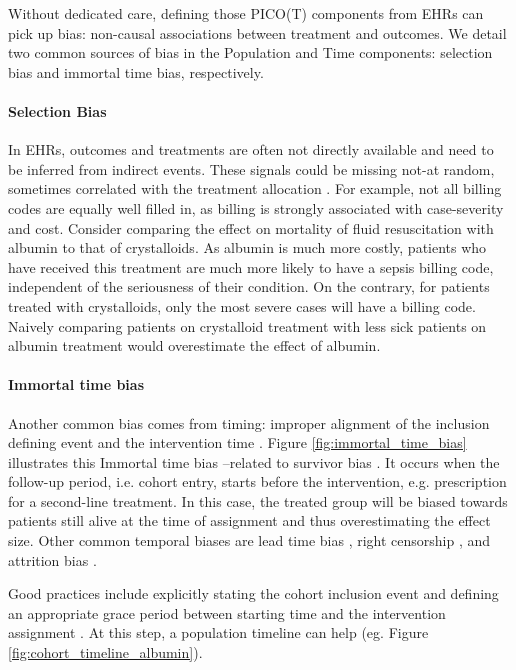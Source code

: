 \documentclass[french,12pt,twoside,a4paper]{book}
\begin{document}
Without dedicated care, defining those PICO(T) components from EHRs can
pick up bias: non-causal associations between treatment and outcomes.
We detail two common sources of bias in the
Population and Time components: selection bias and immortal time bias, respectively.

\paragraph{Selection Bias} In EHRs, outcomes and treatments are often not
directly available and need to be inferred from indirect events. These signals
could be missing not-at random, sometimes correlated with the treatment
allocation \citep{weiskopf2023healthcare}. For example, not all billing
codes are equally well filled in, as billing is strongly associated with
case-severity and cost.
Consider comparing the effect on mortality of fluid resuscitation
with albumin to that of crystalloids. As albumin is much more costly,
patients who have received this treatment are much more likely to have
a sepsis billing code, independent of the seriousness of their
condition. On the contrary, for patients treated with crystalloids, only
the most severe cases will have a billing code. Naively comparing patients on crystalloid treatment with
less sick patients on albumin treatment would overestimate the effect of albumin.

\paragraph{Immortal time bias} Another common bias comes from timing:
improper alignment of the inclusion defining event and the intervention time
\citep{suissa2008immortal,hernan2016specifying,wang2022understanding}. Figure
\ref{fig:immortal_time_bias} illustrates this
Immortal time bias --related to survivor bias \citep{lee2020immortaltimebias}.
It occurs when the follow-up period, i.e. cohort entry, starts before the
intervention, e.g. prescription for a
second-line treatment. In this case, the treated group will be
biased towards patients still alive at the time of assignment and thus
overestimating the effect size. Other common temporal biases are lead time bias
\citep{Oke2021leadtimebias,fu2021timing}, right censorship
\citep{hernan2016specifying}, and attrition bias
\citep{Bankhead2017attritionbias}.


Good practices include explicitly stating the cohort inclusion event
\citep[Chapter~10:Defining Cohorts]{ohdsi2019book} and defining an appropriate
grace period between starting time and the intervention assignment
\citep{hernan2016specifying}. At this step, a population timeline can help (eg.
Figure \ref{fig:cohort_timeline_albumin}).
\end{document}
